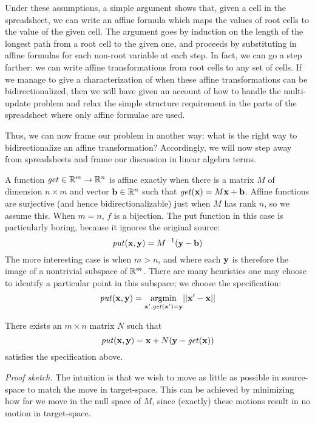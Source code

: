 Under these assumptions, a simple argument shows that, given a cell in the
spreadsheet, we can write an affine formula which maps the values of root
cells to the value of the given cell. The argument goes by induction on the
length of the longest path from a root cell to the given one, and proceeds
by substituting in affine formulas for each non-root variable at each step.
In fact, we can go a step farther: we can write affine transformations from
root cells to any set of cells. If we manage to give a characterization of
when these affine transformations can be bidirectionalized, then we will
have given an account of how to handle the multi-update problem and relax
the simple structure requirement in the parts of the spreadsheet where only
affine formulae are used.

Thus, we can now frame our problem in another way: what is the right way to
bidirectionalize an affine transformation? Accordingly, we will now step
away from spreadsheets and frame our discussion in linear algebra terms.

A function $\mathit{get} \in \mathbb R^m \to \mathbb R^n$ is affine exactly when there is a matrix
$M$ of dimension $n \times m$ and vector $\mathbf b \in \mathbb R^n$ such that $\mathit{get}(\mathbf x) =
M\mathbf x +\mathbf b$.  Affine functions are surjective (and hence bidirectionalizable)
just when $M$ has rank $n$, so we assume this. When $m=n$, $f$ is a
bijection. The put function in this case is particularly boring, because it
ignores the original source:
\[\mathit{put}(\mathbf x,\mathbf y) = M^{-1}(\mathbf y-\mathbf b)\]
The more interesting case is when $m>n$, and where each $\mathbf y$ is therefore
the image of a nontrivial subspace of $\mathbb R^m$. There are many heuristics one
may choose to identify a particular point in this subspace; we choose the
specification:
\[\mathit{put}(\mathbf x,\mathbf y) = \underset{\mathbf x',\mathit{get}(\mathbf x')=\mathbf y}{\operatorname{argmin}}||\mathbf x' - \mathbf x||\]

\begin{lemma}
    There exists an $m \times n$ matrix $N$ such that
    \[\mathit{put}(\mathbf x,\mathbf y) = \mathbf x + N(\mathbf y - \mathit{get}(\mathbf x))\]
    satisfies the specification above.
\end{lemma}
\emph{Proof sketch.} The intuition is that we wish to move as little as
possible in source-space to match the move in target-space. This can be
achieved by minimizing how far we move in the null space of $M$, since
(exactly) these motions result in no motion in target-space.

